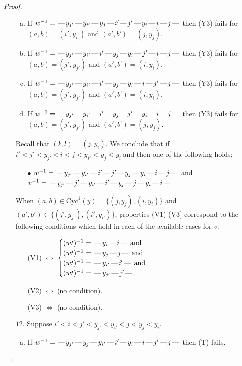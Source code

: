 \documentclass[10pt]{article}
\theoremstyle{definition}
\theoremstyle{definition}
\def\dash{\text{\hspace{0.5mm}---\hspace{0.5mm}}}
\def\Cyc{\mathrm{Cyc}}
\begin{document}
\begin{proof}
\begin{enumerate}
\begin{enumerate}[(a)]
\item If $w^{-1} = \dash y_{j'}\dash y_{i'}\dash y_j\dash i'\dash j'\dash y_i\dash i\dash j\dash $ then (Y3) fails for $(a,b)=(i',y_{i'})$ and $(a',b')=(j,y_j)$.
\item If $w^{-1} = \dash y_{j'}\dash y_{i'}\dash i'\dash y_j\dash y_i\dash j'\dash i\dash j\dash $ then (Y3) fails for $(a,b)=(j',y_{j'})$ and $(a',b')=(i,y_i)$.
\item If $w^{-1} = \dash y_{j'}\dash y_{i'}\dash i'\dash y_j\dash y_i\dash i\dash j'\dash j\dash $ then (Y3) fails for $(a,b)=(j',y_{j'})$ and $(a',b')=(i,y_i)$.
\item If $w^{-1} = \dash y_{j'}\dash y_{i'}\dash i'\dash y_j\dash j'\dash y_i\dash i\dash j\dash $ then (Y3) fails for $(a,b)=(j',y_{j'})$ and $(a',b')=(j,y_j)$.
\end{enumerate}
Recall that $(k,l) = (j,y_i)$.
We conclude that if $i' < j' < y_{j'} < i < j < y_{i'} < y_j < y_i$ and then one of the following holds:
\begin{enumerate}
\item[$\bullet$] $w^{-1} = \dash y_{j'}\dash y_{i'}\dash i'\dash j'\dash y_j\dash y_i\dash i\dash j\dash $ and $v^{-1} = \dash y_{j'}\dash j'\dash y_{i'}\dash i'\dash y_j\dash j\dash y_i\dash i\dash $.
\end{enumerate}
When $(a,b)\in\Cyc^1(y)=\{(j,y_j),(i,y_i)\}$ and $(a',b')\in\{(j',y_{j'}),(i',y_{i'})\}$,
properties (V1)-(V3) correspond to the following conditions which hold in
each of the available cases for $v$:
\begin{enumerate}
\item[](V1) $\Leftrightarrow$ $\begin{cases}\text{$(wt)^{-1} = \dash y_i \dash i \dash$}\text{ and }\\
\text{$(wt)^{-1} = \dash y_j \dash j \dash$}\text{ and }\\
\text{$(wt)^{-1} = \dash y_{i'} \dash i' \dash$}\text{ and }\\
\text{$(wt)^{-1} = \dash y_{j'} \dash j' \dash$}.\end{cases}$
\item[](V2) $\Leftrightarrow$ (no condition).
\item[](V3) $\Leftrightarrow$ (no condition).
\end{enumerate}
\item[$12$.] Suppose $i' < i < j' < y_{j'} < y_{i'} < j < y_j < y_i$.
\begin{enumerate}[(a)]
\item If $w^{-1} = \dash y_{j'}\dash y_j\dash y_{i'}\dash i'\dash y_i\dash i\dash j'\dash j\dash $ then (T) fails.

\end{enumerate}
\end{enumerate}
\end{proof}
\end{document}
